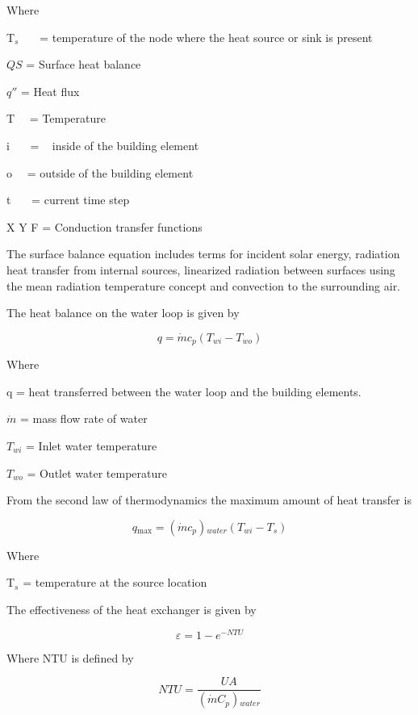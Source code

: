Where

T\(_{s}\)~~~ = temperature of the node where the heat source or sink is present

\(QS\) = Surface heat balance

\({q''}\) = Heat flux

T~~ = Temperature

i~~~ = ~ inside of the building element

o~~ = outside of the building element

t~~~ = current time step

X Y F = Conduction transfer functions

The surface balance equation includes terms for incident solar energy, radiation heat transfer from internal sources, linearized radiation between surfaces using the mean radiation temperature concept and convection to the surrounding air.

The heat balance on the water loop is given by

\begin{equation}
q = \dot mc{}_p(T{}_{wi} - T{}_{wo})
\end{equation}

Where

q = heat transferred between the water loop and the building elements.

\(\dot m\) = mass flow rate of water

\(T{}_{wi}\) = Inlet water temperature

\(T{}_{wo}\) = Outlet water temperature

From the second law of thermodynamics the maximum amount of heat transfer is

\begin{equation}
q{}_{\max } = (\dot mc{}_p){}_{water}(T{}_{wi} - T{}_s)
\end{equation}

Where

T\(_{s}\) = temperature at the source location

The effectiveness of the heat exchanger is given by

\begin{equation}
\varepsilon  = 1 - {e^{ - NTU}}
\end{equation}

Where NTU is defined by

\begin{equation}
NTU = \frac{{UA}}{{(\dot mC{}_p){}_{water}}}
\end{equation}

